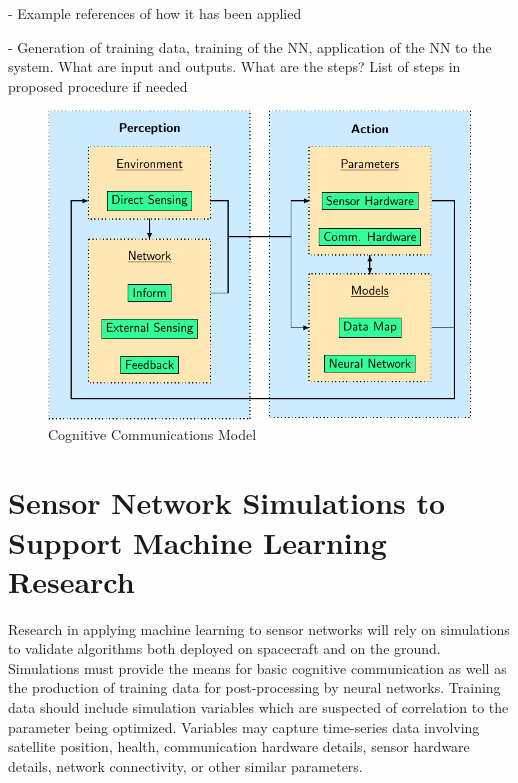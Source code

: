 \documentclass[conference]{IEEEtran}
\begin{document}

{
  \color{red}
  - Example references of how it has been applied

  - Generation of training data, training of the NN, application of the NN to
  the system. What are input and outputs. What are the steps? List of steps in
  proposed procedure if needed
}

\begin{figure}[t]
  \centerline{\includegraphics[width=0.9\linewidth]{images/working/flowchart.pdf}}
  \caption{Cognitive Communications Model}
  \label{fig:model}
\end{figure}

\vfill


\section{Sensor Network Simulations to Support Machine Learning Research}
\label{sec:software}

Research in applying machine learning to sensor networks will rely on
simulations to validate algorithms both deployed on spacecraft and on the
ground.  Simulations must provide the means for basic cognitive communication as
well as the production of training data for post-processing by neural networks.
Training data should include simulation variables which are suspected of
correlation to the parameter being optimized.  Variables may capture time-series
data involving satellite position, health, communication hardware details,
sensor hardware details, network connectivity, or other similar parameters.
\end{document}
